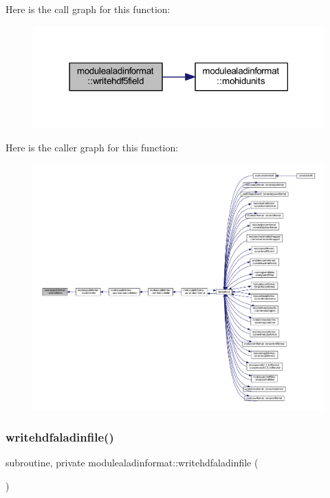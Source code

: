 Here is the call graph for this function\+:\nopagebreak
\begin{figure}[H]
\begin{center}
\leavevmode
\includegraphics[width=318pt]{namespacemodulealadinformat_a9b5030d175b249bcc7e4f88c7e8bffec_cgraph}
\end{center}
\end{figure}
Here is the caller graph for this function\+:\nopagebreak
\begin{figure}[H]
\begin{center}
\leavevmode
\includegraphics[width=350pt]{namespacemodulealadinformat_a9b5030d175b249bcc7e4f88c7e8bffec_icgraph}
\end{center}
\end{figure}
\mbox{\label{namespacemodulealadinformat_ad234b4831ac8d0d1f8ad444d37000469}} 
\subsubsection{\texorpdfstring{writehdfaladinfile()}{writehdfaladinfile()}}
{\footnotesize\ttfamily subroutine, private modulealadinformat\+::writehdfaladinfile (\begin{DoxyParamCaption}{ }\end{DoxyParamCaption})\hspace{0.3cm}{\ttfamily [private]}}

